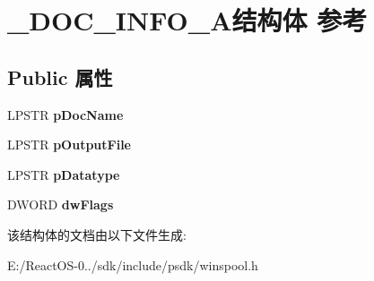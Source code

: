 \hypertarget{struct___d_o_c___i_n_f_o__3_a}{}\section{\+\_\+\+D\+O\+C\+\_\+\+I\+N\+F\+O\+\_\+A结构体 参考}
\label{struct___d_o_c___i_n_f_o__3_a}
\subsection*{Public 属性}
\begin{DoxyCompactItemize}
\item 
\mbox{\label{struct___d_o_c___i_n_f_o__3_a_a3d7d4e16c01c8246a610eddf8721ff36}} 
L\+P\+S\+TR {\bfseries p\+Doc\+Name}
\item 
\mbox{\label{struct___d_o_c___i_n_f_o__3_a_a71c09ebcf215398e7cd99f2b1d934234}} 
L\+P\+S\+TR {\bfseries p\+Output\+File}
\item 
\mbox{\label{struct___d_o_c___i_n_f_o__3_a_ac037af34a02ec9d096ca04fd964f70a2}} 
L\+P\+S\+TR {\bfseries p\+Datatype}
\item 
\mbox{\label{struct___d_o_c___i_n_f_o__3_a_a8456cdac1f5f74e23075ab5076e529ab}} 
D\+W\+O\+RD {\bfseries dw\+Flags}
\end{DoxyCompactItemize}


该结构体的文档由以下文件生成\+:\begin{DoxyCompactItemize}
\item 
E\+:/\+React\+O\+S-\/0../sdk/include/psdk/winspool.\+h\end{DoxyCompactItemize}
